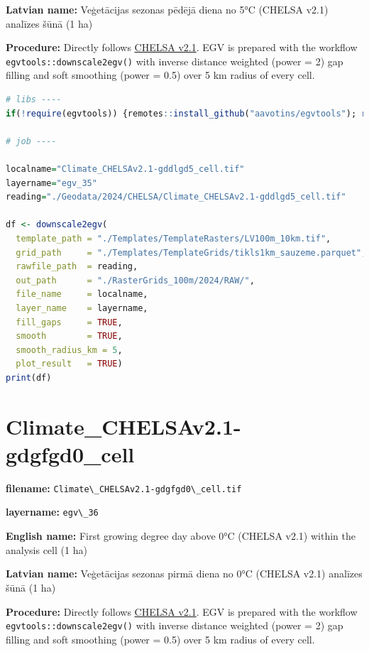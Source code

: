 \documentclass[
]{book}
\newcommand{\passthrough}[1]{#1}
\begin{document}
\textbf{Latvian name:} Veģetācijas sezonas pēdējā diena no 5°C (CHELSA v2.1) analīzes šūnā (1 ha)

\textbf{Procedure:} Directly follows \hyperref[Ch04.11]{CHELSA v2.1}. EGV is prepared with the
workflow \passthrough{\lstinline!egvtools::downscale2egv()!} with inverse distance weighted (power = 2)
gap filling and soft smoothing (power = 0.5) over 5 km radius of every cell.

\begin{lstlisting}[language=R]
# libs ----
if(!require(egvtools)) {remotes::install_github("aavotins/egvtools"); require(egvtools)}

# job ----

localname="Climate_CHELSAv2.1-gddlgd5_cell.tif"
layername="egv_35"
reading="./Geodata/2024/CHELSA/Climate_CHELSAv2.1-gddlgd5_cell.tif"

df <- downscale2egv(
  template_path = "./Templates/TemplateRasters/LV100m_10km.tif",
  grid_path     = "./Templates/TemplateGrids/tikls1km_sauzeme.parquet",
  rawfile_path  = reading,
  out_path      = "./RasterGrids_100m/2024/RAW/",
  file_name     = localname,
  layer_name    = layername,
  fill_gaps     = TRUE,
  smooth        = TRUE,
  smooth_radius_km = 5,
  plot_result   = TRUE)
print(df)
\end{lstlisting}

\section{Climate\_CHELSAv2.1-gdgfgd0\_cell}\label{ch06.036}

\textbf{filename:} \passthrough{\lstinline!Climate\_CHELSAv2.1-gdgfgd0\_cell.tif!}

\textbf{layername:} \passthrough{\lstinline!egv\_36!}

\textbf{English name:} First growing degree day above 0°C (CHELSA v2.1) within the analysis cell (1 ha)

\textbf{Latvian name:} Veģetācijas sezonas pirmā diena no 0°C (CHELSA v2.1) analīzes šūnā (1 ha)

\textbf{Procedure:} Directly follows \hyperref[Ch04.11]{CHELSA v2.1}. EGV is prepared with the
workflow \passthrough{\lstinline!egvtools::downscale2egv()!} with inverse distance weighted (power = 2)
gap filling and soft smoothing (power = 0.5) over 5 km radius of every cell.
\end{document}
